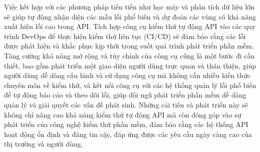 Việc kết hợp với các phương pháp tiên tiến như học máy và phân tích dữ liệu lớn sẽ giúp tự động nhận diện các mẫu lỗi phổ biến và dự đoán các vùng có khả năng xuất hiện lỗi cao trong API. Tích hợp công cụ kiểm thử tự động API vào các quy trình DevOps để thực hiện kiểm thử liên tục (CI/CD) sẽ đảm bảo rằng các lỗi được phát hiện và khắc phục kịp thời trong suốt quá trình phát triển phần mềm. Tăng cường khả năng mở rộng và tùy chỉnh của công cụ cũng là một bước đi cần thiết, bao gồm phát triển một giao diện người dùng trực quan và thân thiện, giúp người dùng dễ dàng cấu hình và sử dụng công cụ mà không cần nhiều kiến thức chuyên môn về kiểm thử, và kết nối công cụ với các hệ thống quản lý lỗi phổ biến để tự động báo cáo và theo dõi lỗi, giúp đội ngũ phát triển phần mềm dễ dàng quản lý và giải quyết các vấn đề phát sinh. Những cải tiến và phát triển này sẽ không chỉ nâng cao khả năng kiểm thử tự động API mà còn đóng góp vào sự phát triển của công nghệ kiểm thử phần mềm, đảm bảo rằng các hệ thống API hoạt động ổn định và đáng tin cậy, đáp ứng được các yêu cầu ngày càng cao của thị trường và người dùng.